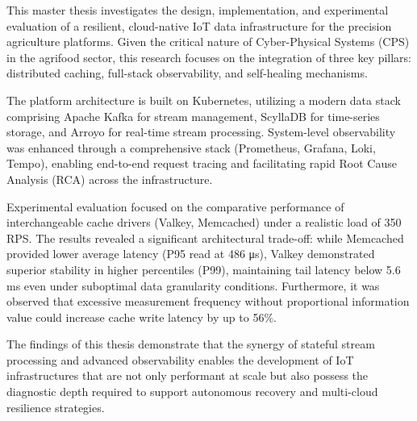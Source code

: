 This master thesis investigates the design, implementation, and experimental
evaluation of a resilient, cloud-native IoT data infrastructure for the
precision agriculture platforms. Given the critical nature of Cyber-Physical
Systems (CPS) in the agrifood sector, this research focuses on the integration
of three key pillars: distributed caching, full-stack observability, and
self-healing mechanisms.

The platform architecture is built on Kubernetes, utilizing a modern data stack
comprising Apache Kafka for stream management, ScyllaDB for time-series
storage, and Arroyo for real-time stream processing. System-level observability
was enhanced through a comprehensive stack (Prometheus, Grafana, Loki, Tempo),
enabling end-to-end request tracing and facilitating rapid Root Cause Analysis
(RCA) across the infrastructure.

Experimental evaluation focused on the comparative performance of
interchangeable cache drivers (Valkey, Memcached) under a realistic load of 350
RPS. The results revealed a significant architectural trade-off: while
Memcached provided lower average latency (P95 read at 486 μs), Valkey
demonstrated superior stability in higher percentiles (P99), maintaining tail
latency below 5.6 ms even under suboptimal data granularity conditions.
Furthermore, it was observed that excessive measurement frequency without
proportional information value could increase cache write latency by up to
56\%.

The findings of this thesis demonstrate that the synergy of stateful stream
processing and advanced observability enables the development of IoT
infrastructures that are not only performant at scale but also possess the
diagnostic depth required to support autonomous recovery and multi-cloud
resilience strategies.
